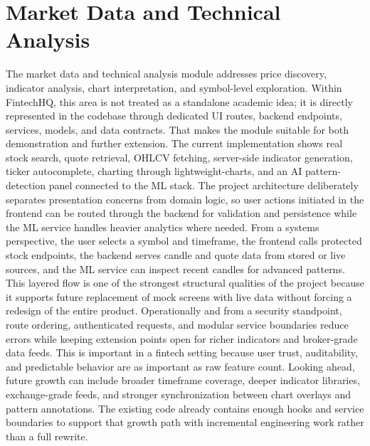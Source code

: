 \documentclass[11pt,a4paper]{article}
\begin{document}
\section{Market Data and Technical Analysis}
The market data and technical analysis module addresses price discovery, indicator analysis, chart interpretation, and symbol-level exploration. Within FintechHQ, this area is not treated as a standalone academic idea; it is directly represented in the codebase through dedicated UI routes, backend endpoints, services, models, and data contracts. That makes the module suitable for both demonstration and further extension. The current implementation shows real stock search, quote retrieval, OHLCV fetching, server-side indicator generation, ticker autocomplete, charting through lightweight-charts, and an AI pattern-detection panel connected to the ML stack. The project architecture deliberately separates presentation concerns from domain logic, so user actions initiated in the frontend can be routed through the backend for validation and persistence while the ML service handles heavier analytics where needed. From a systems perspective, the user selects a symbol and timeframe, the frontend calls protected stock endpoints, the backend serves candle and quote data from stored or live sources, and the ML service can inspect recent candles for advanced patterns. This layered flow is one of the strongest structural qualities of the project because it supports future replacement of mock screens with live data without forcing a redesign of the entire product. Operationally and from a security standpoint, route ordering, authenticated requests, and modular service boundaries reduce errors while keeping extension points open for richer indicators and broker-grade data feeds. This is important in a fintech setting because user trust, auditability, and predictable behavior are as important as raw feature count. Looking ahead, future growth can include broader timeframe coverage, deeper indicator libraries, exchange-grade feeds, and stronger synchronization between chart overlays and pattern annotations. The existing code already contains enough hooks and service boundaries to support that growth path with incremental engineering work rather than a full rewrite.
\end{document}
